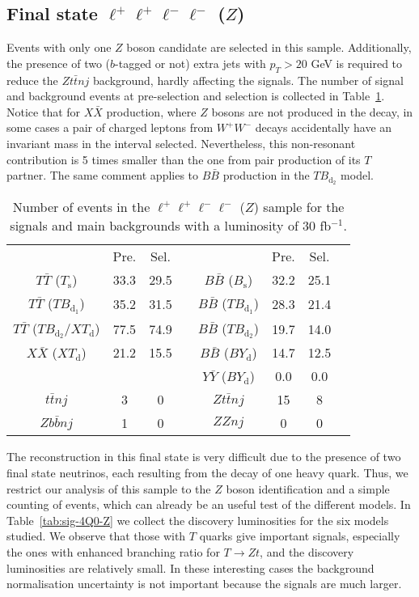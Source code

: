 \documentclass[12pt,a4paper]{article}
\newcommand{\fbin}{fb$^{-1}$}
\newcommand{\TT}{T \bar T}
\newcommand{\BB}{B \bar B}
\newcommand{\XX}{X \bar X}
\newcommand{\YY}{Y \bar Y}
\newcommand{\Ts}{T_\text{s}}
\newcommand{\Bs}{B_\text{s}}
\newcommand{\TBd}{TB_{\text{d}_1}}
\newcommand{\TBD}{TB_{\text{d}_2}}
\newcommand{\XTd}{XT_\text{d}}
\newcommand{\BYd}{BY_\text{d}}
\begin{document}
\subsection{Final state $\ell^+ \ell^+ \ell^- \ell^-$ ($Z$)}


Events with only one $Z$ boson candidate are selected in this sample. Additionally, the presence of two ($b$-tagged or not) extra jets with $p_T > 20$ GeV is required to reduce the $Z t \bar t nj$ background, hardly affecting the signals. The number of signal and background events at pre-selection and selection is collected in Table~\ref{tab:nsnb-4Q0-Z}.
Notice that for $X \bar X$ production, where $Z$ bosons are not produced in the decay,
in some cases a pair of charged leptons from $W^+ W^-$ decays accidentally have an invariant mass in the interval selected. Nevertheless, this non-resonant contribution is 5 times smaller than the one from pair production of its $T$ partner. The same comment applies to $B \bar B$ production in the $\TBD$ model.

\begin{table}[htb]
\begin{center}
\begin{tabular}{cccccccc}
               & Pre. & Sel. & \quad &          & Pre. & Sel. \\[1mm]
$\TT$ ($\Ts$)  & 33.3 & 29.5 & & $\BB$ ($\Bs$)  & 32.2 & 25.1 \\
$\TT$ ($\TBd$) & 35.2 & 31.5 & & $\BB$ ($\TBd$) & 28.3 & 21.4 \\
$\TT$ ($\TBD$/$\XTd$) & 77.5 & 74.9 & & $\BB$ ($\TBD$) & 19.7 & 14.0 \\
$\XX$ ($\XTd$) & 21.2 & 15.5 & & $\BB$ ($\BYd$) & 14.7 & 12.5 \\
               &      &      & & $\YY$ ($\BYd$) & 0.0  & 0.0   \\
\hline
$t \bar t nj$  & 3    & 0    & & $Zt \bar tnj$  & 15   & 8   \\
$Z b \bar bnj$ & 1    & 0    & & $ZZnj$         & 0    & 0     \\
\end{tabular}
\end{center}
\caption{Number of events in the $\ell^+ \ell^+ \ell^- \ell^-$ ($Z$) sample for
the signals and main backgrounds with a luminosity of 30 \fbin.}
\label{tab:nsnb-4Q0-Z}
\end{table}

The reconstruction in this final state is very difficult due to the presence of two final state neutrinos, each resulting from the decay of one heavy quark. Thus, we restrict our analysis of this sample to the $Z$ boson identification and a simple counting of events, which can already be an useful test of the different models. In Table~\ref{tab:sig-4Q0-Z} we collect the discovery luminosities for the six models studied.
We observe that those with $T$ quarks give important signals, especially the ones with enhanced branching ratio for $T \to Zt$, and the discovery luminosities are relatively small.
In these interesting cases the background normalisation uncertainty is not important because the signals are much larger.
\end{document}
